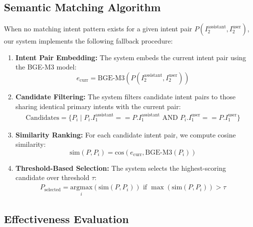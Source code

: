 \documentclass[
]{style/ceurart}
\begin{document}
\subsection{Semantic Matching Algorithm}
When no matching intent pattern exists for a given intent pair $P(I^{\text{assistant}}_2, I^{\text{user}}_2)$, our system implements the following fallback procedure:

\begin{enumerate}
    \item \textbf{Intent Pair Embedding:} The system embeds the current intent pair using the BGE-M3 model:
    \begin{equation}
        e_{\text{curr}} = \text{BGE-M3}(P(I^{\text{assistant}}_2, I^{\text{user}}_2))
    \end{equation}

    \item \textbf{Candidate Filtering:} The system filters candidate intent pairs to those sharing identical primary intents with the current pair:
    \begin{equation}
    \begin{split}
        \text{Candidates} = \{P_i \mid  P_i.I^{\text{assistant}}_1 == P.I^{\text{assistant}}_1 \text{ AND } P_i.I^{\text{user}}_1 == P.I^{\text{user}}_1\}
    \end{split}
    \end{equation}

    \item \textbf{Similarity Ranking:} For each candidate intent pair, we compute cosine similarity:
    \begin{equation}
        \text{sim}(P, P_i) = \text{cos}(e_{\text{curr}}, \text{BGE-M3}(P_i))
    \end{equation}

    \item \textbf{Threshold-Based Selection:} The system selects the highest-scoring candidate over threshold $\tau$:
    \begin{equation}
    \begin{split}
         P_{\text{selected}} = \underset{i}{\text{argmax}}(\text{sim}(P, P_i)) \text{ if } \max(\text{sim}(P, P_i)) > \tau
    \end{split}
    \end{equation}
\end{enumerate}

\subsection{Effectiveness Evaluation}
\end{document}
